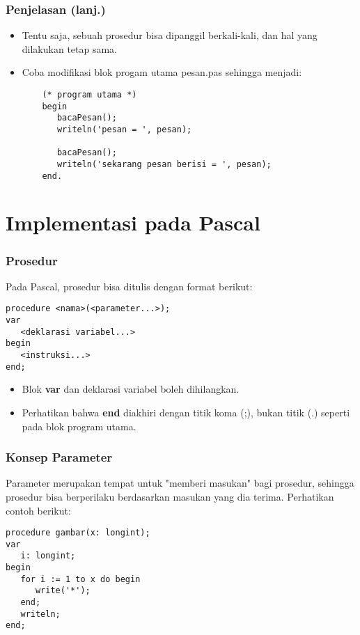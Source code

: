 \documentclass{beamer}
\begin{document}
\begin{frame}[fragile]
\frametitle{Penjelasan (lanj.)}
\begin{itemize}
	\item Tentu saja, sebuah prosedur bisa dipanggil berkali-kali, dan hal yang dilakukan tetap sama.
	\item Coba modifikasi blok progam utama pesan.pas sehingga menjadi:
	\begin{lstlisting}
	(* program utama *)
	begin
	   bacaPesan();
	   writeln('pesan = ', pesan);
	   
	   bacaPesan();
	   writeln('sekarang pesan berisi = ', pesan);
	end.
	\end{lstlisting}
\end{itemize}
\end{frame}

\section{Implementasi pada Pascal}
\frame{\sectionpage}

\begin{frame}[fragile]
\frametitle{Prosedur}
Pada Pascal, prosedur bisa ditulis dengan format berikut:
\begin{lstlisting}
procedure <nama>(<parameter...>);
var
   <deklarasi variabel...>
begin
   <instruksi...>
end;
\end{lstlisting}
\begin{itemize}
	\item Blok \textbf{var} dan deklarasi variabel boleh dihilangkan.
	\item Perhatikan bahwa \textbf{end} diakhiri dengan titik koma (;), bukan titik (.) seperti pada blok program utama.
\end{itemize}
\end{frame}

\begin{frame}[fragile]
\frametitle{Konsep Parameter}
Parameter merupakan tempat untuk "memberi masukan" bagi prosedur, sehingga prosedur bisa berperilaku berdasarkan masukan yang dia terima.
\vfill
Perhatikan contoh berikut:
\begin{lstlisting}
procedure gambar(x: longint);
var
   i: longint;
begin
   for i := 1 to x do begin
      write('*');
   end;
   writeln;
end;
\end{lstlisting}
\end{frame}
\end{document}
